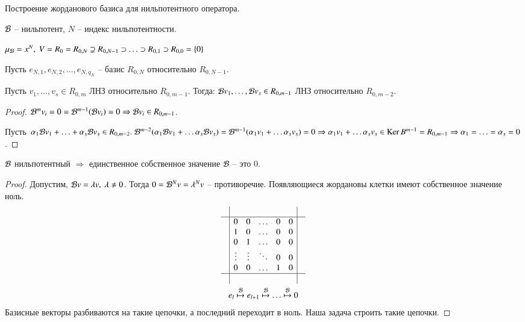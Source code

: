 \documentclass[main]{subfiles}
\begin{document}
Построение жорданового базиса для нильпотентного оператора.

$\mathcal{B}$ -- нильпотент, $N$ -- индекс нильпотентности.

$\mu_{\mathcal{B}} = x^N, \ V = R_0 = R_{0, N} \supsetneq R_{0, N-1} \supset \ldots \supset R_{0, 1} \supset R_{0, 0} = \{0\}$

Пусть $e_{N, 1}, e_{N,2}, \ldots, e_{N, q_N}$ -- базис $R_{0, N}$ относительно $R_{0, N-1}$.

\begin{lemma}
  Пусть $v_1, \ldots, v_s \in R_{0, m}$ ЛНЗ относительно $R_{0, m-1}$.
  Тогда: $\mathcal{B} v_1, \ldots, \mathcal{B} v_s \in R_{0, m-1}$ ЛНЗ относительно $R_{0, m-2}$. 
\end{lemma}

\begin{proof}
  $\mathcal{B}^m v_i = 0 = \mathcal{B}^{m-1}(\mathcal{B} v_i) = 0 \Rightarrow \mathcal{B} v_i \in R_{0, m-1}$.

  Пусть $\alpha_1 \mathcal{B} v_1 + \ldots + \alpha_s \mathcal{B} v_s \in R_{0, m-2}. \ \mathcal{B}^{m-2}(\alpha_1 \mathcal{B} v_1 + \ldots \alpha_s \mathcal{B} v_s) =
    \mathcal{B}^{m-1}(\alpha_1 v_1 + \ldots \alpha_s v_s) = 0 \Rightarrow \alpha_1 v_1 + \ldots \alpha_s v_s \in \operatorname{Ker} B^{m-1} = R_{0, m-1}
    \Rightarrow \alpha_1 = \ldots = \alpha_s = 0$.
\end{proof}
\begin{remark}
  $\mathcal{B}$  нильпотентный $\Rightarrow$ единственное собственное значение $\mathcal{B}$ -- это 0.
\end{remark}

\begin{proof}
  Допустим, $\mathcal{B} v = \lambda v, \ \lambda\neq 0$. Тогда $0 = \mathcal{B}^N v = \lambda^N v$  -- противоречие. Появляющиеся жордановы клетки имеют собственное значение ноль.
  \begin{gather*}
    \begin{array}{c|c|c}
       &                                     & \\
      \hline
       & \begin{matrix}
           0      & 0      & \ldots & 0 & 0 \\
           1      & 0      & \ldots & 0 & 0 \\
           0      & 1      & \ldots & 0 & 0 \\
           \vdots & \vdots & \ddots & 0 & 0 \\
           0      & 0      & \ldots & 1 & 0 \\
         \end{matrix} &      \\
      \hline
       &                                     & \\
    \end{array} \\
    e_l \stackrel{\mathcal{B}}{\mapsto} e_{l+1} \stackrel{\mathcal{B}}{\mapsto} \ldots \stackrel{\mathcal{B}}{\mapsto} 0
  \end{gather*}
  Базисные векторы разбиваются на такие цепочки, а последний переходит в ноль. Наша задача строить такие цепочки.
\end{proof}
\end{document}
